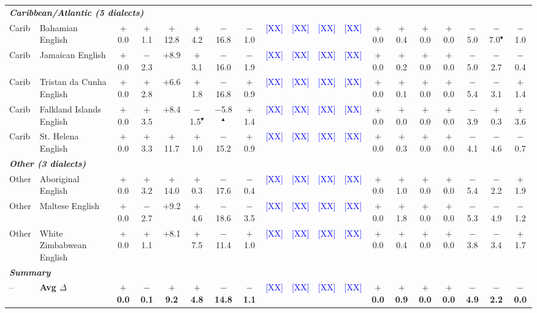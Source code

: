 \begin{table}[t]
\begin{tabular}{llccccccccccccccccc}
\midrule
\multicolumn{19}{l}{\textit{\textbf{Caribbean/Atlantic (5 dialects)}}} \\
Carib & Bahamian English & $+$0.0 & $+$1.1 & $+$12.8 & $+$4.2 & $-$16.8 & $-$1.0 & \textcolor{blue}{[XX]} & \textcolor{blue}{[XX]} & \textcolor{blue}{[XX]} & \textcolor{blue}{[XX]} & $+$0.0 & $+$0.4 & $+$0.0 & $+$0.0 & $-$5.0 & $-$7.0$^\blacktriangledown$ & $-$1.0 \\
Carib & Jamaican English & $+$0.0 & $-$2.3 & $+$8.9 & $+$3.1 & $-$16.0 & $-$1.9 & \textcolor{blue}{[XX]} & \textcolor{blue}{[XX]} & \textcolor{blue}{[XX]} & \textcolor{blue}{[XX]} & $+$0.0 & $+$0.2 & $+$0.0 & $+$0.0 & $-$5.0 & $-$2.7 & $-$0.4 \\
Carib & Tristan da Cunha English & $+$0.0 & $+$2.8 & $+$6.6 & $+$1.8 & $-$16.8 & $+$0.9 & \textcolor{blue}{[XX]} & \textcolor{blue}{[XX]} & \textcolor{blue}{[XX]} & \textcolor{blue}{[XX]} & $+$0.0 & $+$0.1 & $+$0.0 & $+$0.0 & $-$5.4 & $-$3.1 & $+$1.4 \\
Carib & Falkland Islands English & $+$0.0 & $+$3.5 & $+$8.4 & $-$1.5$^\blacktriangledown$ & $-$5.8$^\blacktriangle$ & $+$1.4 & \textcolor{blue}{[XX]} & \textcolor{blue}{[XX]} & \textcolor{blue}{[XX]} & \textcolor{blue}{[XX]} & $+$0.0 & $+$0.0 & $+$0.0 & $+$0.0 & $-$3.9 & $+$0.3 & $+$3.6 \\
Carib & St. Helena English & $+$0.0 & $+$3.3 & $+$11.7 & $+$1.0 & $-$15.2 & $+$0.9 & \textcolor{blue}{[XX]} & \textcolor{blue}{[XX]} & \textcolor{blue}{[XX]} & \textcolor{blue}{[XX]} & $+$0.0 & $+$0.3 & $+$0.0 & $+$0.0 & $-$4.1 & $-$4.6 & $-$0.7 \\
\midrule
\multicolumn{19}{l}{\textit{\textbf{Other (3 dialects)}}} \\
Other & Aboriginal English & $+$0.0 & $+$3.2 & $+$14.0 & $+$0.3 & $-$17.6 & $-$0.4 & \textcolor{blue}{[XX]} & \textcolor{blue}{[XX]} & \textcolor{blue}{[XX]} & \textcolor{blue}{[XX]} & $+$0.0 & $+$1.0 & $+$0.0 & $+$0.0 & $-$5.4 & $-$2.2 & $+$1.9 \\
Other & Maltese English & $+$0.0 & $-$2.7 & $+$9.2 & $+$4.6 & $-$18.6 & $-$3.5 & \textcolor{blue}{[XX]} & \textcolor{blue}{[XX]} & \textcolor{blue}{[XX]} & \textcolor{blue}{[XX]} & $+$0.0 & $+$1.8 & $+$0.0 & $+$0.0 & $-$5.3 & $-$4.9 & $-$1.2 \\
Other & White Zimbabwean English & $+$0.0 & $+$1.1 & $+$8.1 & $+$7.5 & $-$11.4 & $+$1.0 & \textcolor{blue}{[XX]} & \textcolor{blue}{[XX]} & \textcolor{blue}{[XX]} & \textcolor{blue}{[XX]} & $+$0.0 & $+$0.4 & $+$0.0 & $+$0.0 & $-$3.8 & $-$3.4 & $+$1.7 \\
\midrule
\multicolumn{19}{l}{\textit{\textbf{Summary}}} \\
-- & \textbf{Avg $\Delta$} & \textbf{$+$0.0} & \textbf{$-$0.1} & \textbf{$+$9.2} & \textbf{$+$4.8} & \textbf{$-$14.8} & \textbf{$-$1.1} & \textcolor{blue}{[XX]} & \textcolor{blue}{[XX]} & \textcolor{blue}{[XX]} & \textcolor{blue}{[XX]} & \textbf{$+$0.0} & \textbf{$+$0.9} & \textbf{$+$0.0} & \textbf{$+$0.0} & \textbf{$-$4.9} & \textbf{$-$2.2} & \textbf{$-$0.0} \\
\bottomrule
\end{tabular}
\end{table}